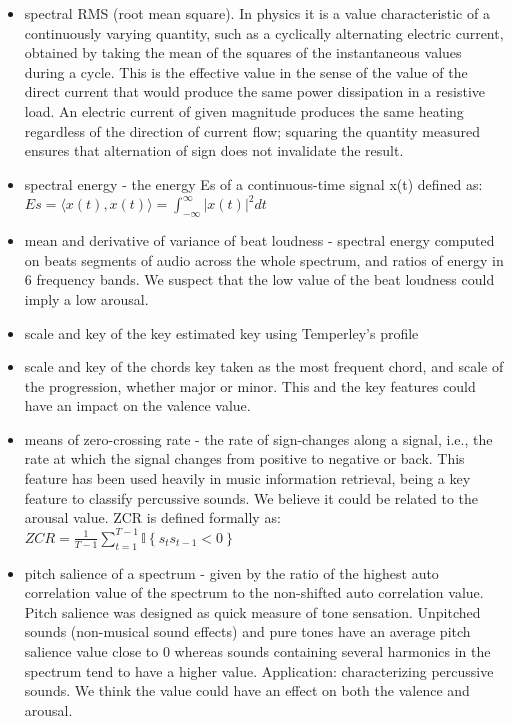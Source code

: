 \begin{itemize}
\item spectral RMS (root mean square). In physics it is a value characteristic of a continuously varying quantity, such as a cyclically alternating electric current, obtained by taking the mean of the squares of the instantaneous values during a cycle. This is the effective value in the sense of the value of the direct current that would produce the same power dissipation in a resistive load. An electric current of given magnitude produces the same heating regardless of the direction of current flow; squaring the quantity measured ensures that alternation of sign does not invalidate the result.
\item spectral energy - the energy E{s} of a continuous-time signal x(t) defined as: \\
$ E{s}  =  \langle x(t), x(t)\rangle =  \int_{-\infty}^{\infty}{|x(t)|^2}dt $

\item mean and derivative of variance of beat loudness -  spectral energy computed on beats segments of audio across the whole spectrum, and ratios of energy in 6 frequency bands. We suspect that the low value of the beat loudness could imply a low arousal.

\item scale and key of the key estimated key using Temperley’s profile

\item scale and key of the chords key taken as the most frequent chord, and scale of the progression, whether major or minor. This and the key features could have an impact on the valence value.

\item means of zero-crossing rate - the rate of sign-changes along a signal, i.e., the rate at which the signal changes from positive to negative or back. This feature has been used heavily in music information retrieval, being a key feature to classify percussive sounds. We believe it could be related to the arousal value.
ZCR is defined formally as: \\
$ZCR = \frac{1}{T-1} \sum_{t=1}^{T-1} {{\mathbb I}\left\{{s_t s_{t-1} < 0}\right\}}$

\item pitch salience of a spectrum - given by the ratio of the highest auto correlation value of the spectrum to the non-shifted auto correlation value. Pitch salience was designed as quick measure of tone sensation. Unpitched sounds (non-musical sound effects) and pure tones have an average pitch salience value close to 0 whereas sounds containing several harmonics in the spectrum tend to have a higher value. Application: characterizing percussive sounds. We think the value could have an effect on both the valence and arousal.


\end{itemize}

